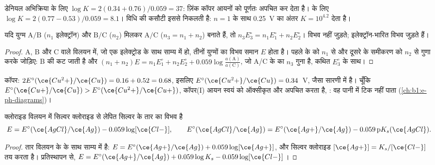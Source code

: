 डेनियल अभिक्रिया के लिए $\log K = 2(0.34 + 0.76)/0.059 = 37$: ज़िंक
कॉपर आयनों को पूर्णतः अपचित कर देता है।  के लिए
$\log K = 2(0.77 - 0.53)/0.059 = 8.1$। विधि की कसौटी इससे
निकलती है: $n = 1$ के साथ \qty{0.25}{V} का अंतर $K = 10^{4.2}$ देता है।

\begin{proposition}[विभवों का संयोजन]\label{prop:b1:nernst:combined-potentials}
यदि युग्म $\mathrm{A}/\mathrm{B}$ ($n_1$ इलेक्ट्रॉन) और
$\mathrm{B}/\mathrm{C}$ ($n_2$) मिलकर $\mathrm{A}/\mathrm{C}$
($n_3 = n_1 + n_2$) बनाते हैं, तो $n_3 E^\circ_3 = n_1 E^\circ_1 + n_2 E^\circ_2$।
विभव नहीं जुड़ते; इलेक्ट्रॉन-भारित विभव जुड़ते हैं।
\end{proposition}

\begin{proof}
A, B और C वाले विलयन में, जो एक इलेक्ट्रोड के साथ साम्य में हो,
तीनों युग्मों का विभव समान $E$ होता है। पहले के  को $n_1$ से और दूसरे के समीकरण को $n_2$ से गुणा करके जोड़िए:
B की  कट जाती है और $(n_1 + n_2)E = n_1E^\circ_1 + n_2E^\circ_2 +
0.059\log\frac{a(\mathrm{A})}{a(\mathrm{C})}$, जो A/C के  का $n_3$ गुना है, कथित $E^\circ_3$ के साथ।
\end{proof}

कॉपर: $2E^\circ(\ce{Cu^2+}/\ce{Cu}) = 0.16 + 0.52 = 0.68$, इसलिए
$E^\circ(\ce{Cu^2+}/\ce{Cu}) = 0.34$~V, जैसा सारणी में है। चूँकि
$E^\circ(\ce{Cu+}/\ce{Cu}) > E^\circ(\ce{Cu^2+}/\ce{Cu+})$, कॉपर(I)
आयन स्वयं को ऑक्सीकृत और अपचित करता है, : वह
पानी में टिक नहीं पाता (\cref{ch:b1:e-ph-diagrams})।

\begin{proposition}[दूसरे प्रकार का इलेक्ट्रोड]\label{prop:b1:nernst:second-kind}
क्लोराइड विलयन में सिल्वर क्लोराइड से लेपित सिल्वर के तार का
विभव है
\[
  E = E^\circ(\ce{AgCl}/\ce{Ag}) - 0.059\log[\ce{Cl-}], \qquad
  E^\circ(\ce{AgCl}/\ce{Ag}) = E^\circ(\ce{Ag+}/\ce{Ag}) - 0.059\,\mathrm{p}K_s(\ce{AgCl}) .
\]
\end{proposition}

\begin{proof}
तार विलयन के  के साथ साम्य में है:
$E = E^\circ(\ce{Ag+}/\ce{Ag}) + 0.059\log[\ce{Ag+}]$, और सिल्वर क्लोराइड
$[\ce{Ag+}] = K_s/[\ce{Cl-}]$ तय करता है। प्रतिस्थापन से,
$E = E^\circ(\ce{Ag+}/\ce{Ag}) + 0.059\log K_s - 0.059\log[\ce{Cl-}]$।
\end{proof}


